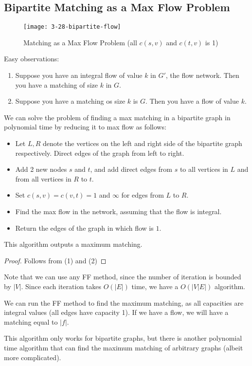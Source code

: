 \documentclass[../main/main.tex]{subfiles}
\begin{document}
\subsection{Bipartite Matching as a Max Flow Problem}
\begin{figure}[h!]
	\centering
	\texttt{[image: 3-28-bipartite-flow]}
	\caption{Matching as a Max Flow Problem (all $c(s,v)$ and  $c(t,v)$ is 1)}
	\label{fig:3-28-bipartiteflow}
\end{figure}\vspace{-0.4cm}
Easy observations:
\begin{enumerate}
	\item Suppose you have an integral flow of value $k$ in $G'$, the flow network. Then you have a matching of size $k$ in $G$.
	\item Suppose you have a matching os size $k$ is $G$. Then you have a flow of value $k$.
\end{enumerate}
\begin{algo}
We can  solve the problem of finding a max matching in a bipartite graph in polynomial time by reducing it to max flow as follows:
	\begin{itemize}
		\item Let $L,R$ denote the vertices on the left and right side of the bipartite graph respectively. Direct edges of the graph from left to right.
		\item Add 2 new nodes $s$ and  $t$, and add direct edges from  $s$ to all vertices in  $L$  and from all vertices in $R$ to  $t$.
		\item Set $c(s,v) =c(v,t)=1$ and $\infty$ for edges from $L$ to $R$.
		\item Find the max flow in the network, assuming that the flow is integral.
		\item Return the edges of the graph in which flow is $1$.
	\end{itemize}
	This algorithm outputs a maximum matching.
\end{algo}
	\begin{proof}
		Follows from (1) and (2)
	\end{proof}

\begin{remark}
	Note that we can use any FF method, since the number of iteration is bounded by $|V|$. Since each iteration takes  $O(|E|)$ time, we have a $O(|V| E|)$ algorithm.

We can run the FF method to find the maximum matching, as all capacities are integral values (all edges have capacity 1). If we have a flow, we will have a matching equal to $|f|$.
	\end{remark}
	\begin{remark}
		This algorithm only works for bipartite graphs, but there is another polynomial time algorithm that can find the maximum matching of arbitrary graphs (albeit more complicated).
	\end{remark}
\end{document}

